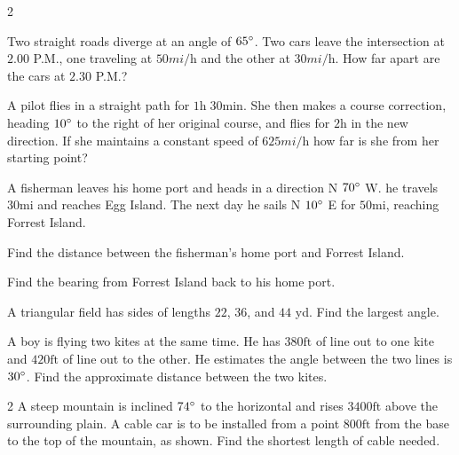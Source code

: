 \begin{description}
\begin{description}
\begin {multicols}{2}
	\item    
	\setlength\fboxrule{0in}\setlength\fboxsep{0.2in}
	\end {multicols}
	
	
	\item [29.]
	Two straight roads diverge at an angle of $65 \mbox{{\ensuremath{{}^\circ}}}$. Two cars leave the intersection at $2.00$ P.M., one traveling at $50 mi/\mbox{h}$ and the other at $30 mi/\mbox{h}$. How far apart are the cars at $2.30$ P.M.? 
	
	\item [31.] A pilot flies
	in a straight path for $1 \mbox{h}\; 30 \mbox{min}$. She then makes a course correction, heading $10 \mbox{{\ensuremath{{}^\circ}}}$ to the right of her original course, and flies for $2 \mbox{h}$ in the new direction. If she
	maintains a constant speed of $625 mi/\mbox{h}$ how far is she from her starting point? 
	
	\item [33.]
	A fisherman leaves his home port and heads in a direction N $70 \mbox{{\ensuremath{{}^\circ}}}$ W. he travels $30 \mbox{mi}$ and reaches Egg Island. The next day he sails N
	$10 \mbox{{\ensuremath{{}^\circ}}}$ E for $50 \mbox{mi}$, reaching Forrest Island. 
	
	\item [(a)]
	Find the distance between the fisherman's home port and Forrest Island. 
	
	\item [(b)]
	Find the bearing from Forrest Island back to his home port. 
	
	\item [35.]
	A triangular field has sides of lengths $22$, $36$, and $44$ yd. Find the largest angle. 
	
	\item [37.]
	A boy is flying two kites at the same time. He has $380 \mbox{ft}$ of line out to one kite and $420 \mbox{ft}$ of line out to the other. He estimates the angle
	between the two lines is $30 \mbox{{\ensuremath{{}^\circ}}}$. Find the approximate distance between the two
	kites. 
	
	\item [39.]   
	\columnsep =30pt
	\begin {multicols}{2}
	A steep mountain is inclined $74 \mbox{{\ensuremath{{}^\circ}}}$ to the horizontal and rises $3400 \mbox{ft}$ above the surrounding plain. A cable car is to
	be installed from a point $800 \mbox{ft}$ from the base to the top of the mountain, as shown. Find
	the shortest length of cable needed. 
	

\end{multicols}
\end{description}
\end{description}
